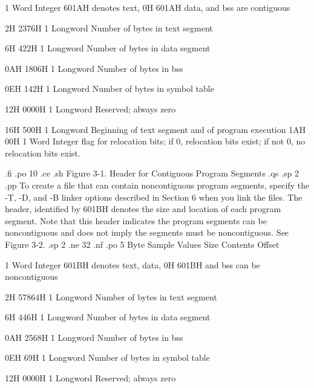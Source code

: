                                1 Word       Integer 601AH denotes text,
  0H      601AH                             data, and bss are contiguous
       
  2H         2376H             1 Longword   Number of bytes in text segment 
       
  6H          422H             1 Longword   Number of bytes in data segment
       
 0AH         1806H             1 Longword   Number of bytes in bss      
       
 0EH          142H             1 Longword   Number of bytes in symbol table  

 12H         0000H             1 Longword   Reserved; always zero      
       
 16H          500H             1 Longword   Beginning of text segment and  
                                            of program execution
 1AH       00H           
                               1 Word       Integer flag for relocation
                                            bits;  if 0, relocation bits
                                            exist;  if not 0, no relocation
                                            bits exist. 

 
.fi
.po 10
.ce
.sh
Figure 3-1.  Header for Contiguous Program Segments
.qs
.sp 2
.pp
To create a file that can contain noncontiguous program segments,
specify the -T, -D, and -B linker options described in
Section 6 when you link the files.  The header, identified by
601BH denotes the size and location of each program
segment.  Note that this header indicates the program segments 
can be noncontiguous and does not imply the segments must be 
noncontiguous.  See Figure 3-2.
.sp 2
.ne 32
.nf
.po 5
Byte    Sample Values        Size            Contents
Offset
                                    
                            1 Word       Integer 601BH denotes text, data,
 0H      601BH                           and bss can be noncontiguous
      
 2H        57864H           1 Longword   Number of bytes in text segment
      
 6H          446H           1 Longword   Number of bytes in data segment
      
0AH         2568H           1 Longword   Number of bytes in bss
      
0EH           69H           1 Longword   Number of bytes in symbol table
      
12H         0000H           1 Longword   Reserved; always zero
      
